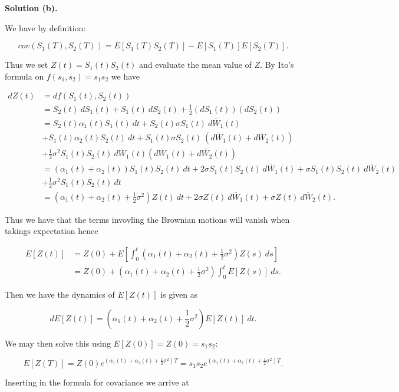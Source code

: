 \documentclass[
]{book}
\begin{document}
\noindent\makebox[\linewidth]{\rule{\textwidth}{0.4pt}}

\textbf{Solution (b).}

We have by definition:

\[
cov(S_1(T),S_2(T))=E\left[S_1(T)S_2(T)\right]-E[S_1(T)]E[S_2(T)].
\]

Thus we set \(Z(t)=S_1(t)S_2(t)\) and evaluate the mean value of \(Z\). By Ito's formula on \(f(s_1,s_2)=s_1s_2\) we have

\begin{align*}
dZ(t)&=df(S_1(t),S_2(t))\\
&=S_2(t)\ dS_1(t)+S_1(t)\ dS_2(t)+\frac{1}{2}(dS_1(t))(dS_2(t))\\
&=S_2(t)\alpha_1(t) S_1(t)\ dt+S_2(t)\sigma S_1(t)\ d\overline{W}_1(t)\\
&+S_1(t)\alpha_2(t) S_2(t)\ dt+S_1(t)\sigma S_2(t)\ (d\overline{W}_1(t)+d\overline{W}_2(t))\\
&+\frac{1}{2}\sigma^2S_1(t)S_2(t)\ d\overline{W}_1(t)(d\overline{W}_1(t)+d\overline{W}_2(t))\\
&=(\alpha_1(t)+\alpha_2(t))S_1(t) S_2(t)\ dt+2\sigma S_1(t) S_2(t)\ d\overline{W}_1(t) + \sigma S_1(t) S_2(t)\ d\overline{W}_2(t)\\
&+\frac{1}{2}\sigma^2S_1(t)S_2(t)\ dt\\
&=(\alpha_1(t)+\alpha_2(t)+\frac{1}{2}\sigma^2)Z(t)\ dt+2\sigma Z(t)\ d\overline{W}_1(t) + \sigma Z(t)\ d\overline{W}_2(t).
\end{align*}

Thus we have that the terms invovling the Brownian motions will vanish when takings expectation hence

\begin{align*}
E[Z(t)]&=Z(0)+E\left[\int_0^t(\alpha_1(t)+\alpha_2(t)+\frac{1}{2}\sigma^2)Z(s)\ ds\right]\\
&=Z(0)+(\alpha_1(t)+\alpha_2(t)+\frac{1}{2}\sigma^2)\int_0^tE\left[Z(s)\right]\ ds.
\end{align*}

Then we have the dynamics of \(E[Z(t)]\) is given as

\[
dE[Z(t)]=(\alpha_1(t)+\alpha_2(t)+\frac{1}{2}\sigma^2)E\left[Z(t)\right]\ dt.
\]

We may then solve this using \(E[Z(0)]=Z(0)=s_1s_2\):

\[
E[Z(T)]=Z(0)e^{(\alpha_1(t)+\alpha_2(t)+\frac{1}{2}\sigma^2)T}=s_1s_2e^{(\alpha_1(t)+\alpha_2(t)+\frac{1}{2}\sigma^2)T}.
\]

Inserting in the formula for covariance we arrive at
\end{document}
